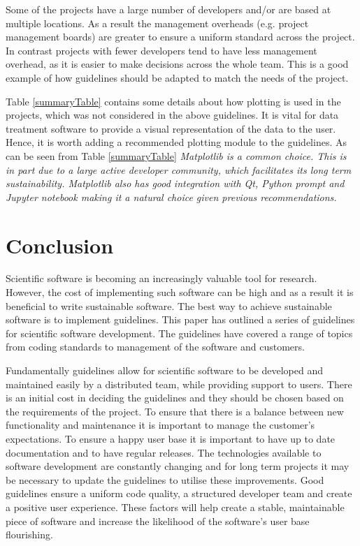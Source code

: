 \documentclass[jnr]{iosart2x}
\begin{document}
Some of the projects have a large number of developers and/or are based at multiple locations.
As a result the management overheads (e.g. project management boards) are greater to ensure a uniform standard across the project.
In contrast projects with fewer developers tend to have less management overhead, as it is easier to make decisions across the whole team.
This is a good example of how guidelines should be adapted to match the needs of the project.

Table \ref{summaryTable} contains some details about how plotting is used in the projects, which was not considered in the above guidelines.
It is vital for data treatment software to provide a visual representation of the data to the user.
Hence, it is worth adding a recommended plotting module to the guidelines.
As can be seen from Table \ref{summaryTable} \it Matplotlib is a common choice.
This is in part due to a large active developer community, which facilitates its long term sustainability.
Matplotlib also has good integration with \it Qt, \it Python prompt and \it{Jupyter notebook} making it a natural choice given previous recommendations.

\section{Conclusion}
\label{Conclusion}

Scientific software is becoming an increasingly valuable tool for research.
However, the cost of implementing such software can be high and as a result it is beneficial to write sustainable software.
The best way to achieve sustainable software is to implement guidelines.
This paper has outlined a series of guidelines for scientific software development.
The guidelines have covered a range of topics from coding standards to management of the software and customers.

Fundamentally guidelines allow for scientific software to be developed and maintained easily by a distributed team, while providing support to users.
There is an initial cost in deciding the guidelines and they should be chosen based on the requirements of the project.
To ensure that there is a balance between new functionality and maintenance it is important to manage the customer's expectations.
To ensure a happy user base it is important to have up to date documentation and to have regular releases.
The technologies available to software development are constantly changing and for long term projects it may be necessary to update the guidelines to utilise these improvements.
Good guidelines ensure a uniform code quality, a structured developer team and create a positive user experience.
These factors will help create a stable, maintainable piece of software and increase the likelihood of the software's user base flourishing.
\end{document}
